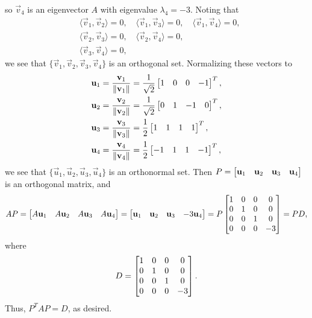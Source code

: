 \documentclass{homework}
\begin{document}
	so $\vec{v}_4$ is an eigenvector $A$ with eigenvalue $\lambda_4 = -3$. Noting that
	\begin{equation*}
		\begin{aligned}
		&\langle\vec{v}_1,\vec{v}_2\rangle = 0, \quad \langle\vec{v}_1,\vec{v}_3\rangle = 0, \quad\langle\vec{v}_1,\vec{v}_4\rangle = 0, \\
		&\langle\vec{v}_2,\vec{v}_3\rangle = 0, \quad \langle\vec{v}_2,\vec{v}_4\rangle = 0,\\
		&\langle\vec{v}_3,\vec{v}_4\rangle = 0,
		\end{aligned}
	\end{equation*}
	we see that $\{\vec{v}_1,\vec{v}_2,\vec{v}_3,\vec{v}_4\}$ is an orthogonal set. Normalizing these vectors to
	\begin{equation*}
		\begin{aligned}
		&\mathbf{u}_1 = \frac{\mathbf{v}_1}{\lVert\mathbf{v}_1\rVert} = \frac{1}{\sqrt{2}}\left[\begin{matrix}1&0&0&-1\end{matrix}\right]^T,\\
		&\mathbf{u}_2 = \frac{\mathbf{v}_2}{\lVert\mathbf{v}_2\rVert} = \frac{1}{\sqrt{2}}\left[\begin{matrix}0&1&-1&0\end{matrix}\right]^T,\\
		&\mathbf{u}_3 = \frac{\mathbf{v}_3}{\lVert\mathbf{v}_3\rVert} = \frac{1}{2}\left[\begin{matrix}1&1&1&1\end{matrix}\right]^T,\\
		&\mathbf{u}_4 = \frac{\mathbf{v}_4}{\lVert\mathbf{v}_4\rVert} = \frac{1}{2}\left[\begin{matrix}-1&1&1&-1\end{matrix}\right]^T,\\
		\end{aligned}
	\end{equation*}
	we see that $\{\vec{u}_1,\vec{u}_2, \vec{u}_3, \vec{u}_4\}$ is an orthonormal set. Then $P = \left[\begin{matrix}\mathbf{u}_1 & \mathbf{u}_2 & \mathbf{u}_3 & \mathbf{u}_4\end{matrix}\right]$ is an orthogonal matrix, and
	\begin{equation*}
		AP = \left[\begin{matrix}A\mathbf{u}_1 & A\mathbf{u}_2 & A\mathbf{u}_3 & A\mathbf{u}_4\end{matrix}\right] = \left[\begin{matrix}\mathbf{u}_1 & \mathbf{u}_2 & \mathbf{u}_3 & -3\mathbf{u}_4\end{matrix}\right] = P\left[\begin{matrix}1 & 0 & 0 & 0 \\ 0 & 1 & 0 & 0 \\ 0 & 0 & 1 & 0 \\ 0 & 0 & 0 &-3\end{matrix}\right] = PD,
	\end{equation*}
	where
	\begin{equation*}
		D = \left[\begin{matrix}1 & 0 & 0 & 0 \\ 0 & 1 & 0 & 0 \\ 0 & 0 & 1 & 0 \\ 0 & 0 & 0 &-3\end{matrix}\right].
	\end{equation*}
	Thus, $P^TAP = D$, as desired.
	
\end{document}
